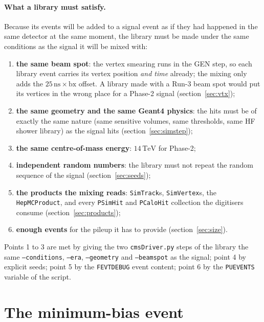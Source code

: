 \documentclass[11pt,a4paper]{article}
\newcommand{\code}[1]{\texttt{#1}}
\newcommand{\bx}{\ensuremath{\mathrm{bx}}}
\newcommand{\TeV}{\,\mathrm{TeV}}
\newcommand{\ns}{\,\mathrm{ns}}
\begin{document}
\paragraph{What a library must satisfy.} Because its events will be added to a signal event as if they
had happened in the same detector at the same moment, the library must be made under the same conditions
as the signal it will be mixed with:
\begin{enumerate}
\item \textbf{the same beam spot}: the vertex smearing runs in the GEN step, so each library event carries its
  vertex position \emph{and time} already; the mixing only adds the $25\ns\times\bx$ offset. A library made
  with a Run-3 beam spot would put its vertices in the wrong place for a Phase-2 signal
  (section~\ref{sec:vtx});
\item \textbf{the same geometry and the same Geant4 physics}: the hits must be of exactly the same nature
  (same sensitive volumes, same thresholds, same HF shower library) as the signal hits
  (section~\ref{sec:simstep});
\item \textbf{the same centre-of-mass energy}: $14\TeV$ for Phase-2;
\item \textbf{independent random numbers}: the library must not repeat the random sequence of the signal
  (section~\ref{sec:seeds});
\item \textbf{the products the mixing reads}: \code{SimTrack}s, \code{SimVertex}s, the \code{HepMCProduct},
  and every \code{PSimHit} and \code{PCaloHit} collection the digitisers consume (section~\ref{sec:products});
\item \textbf{enough events} for the pileup it has to provide (section~\ref{sec:size}).
\end{enumerate}
Points 1 to 3 are met by giving the two \code{cmsDriver.py} steps of the library the same \code{--conditions},
\code{--era}, \code{--geometry} and \code{--beamspot} as the signal; point 4 by explicit seeds; point 5 by the
\code{FEVTDEBUG} event content; point 6 by the \code{PUEVENTS} variable of the script.

\section{The minimum-bias event}
\label{sec:minbias}
\end{document}
